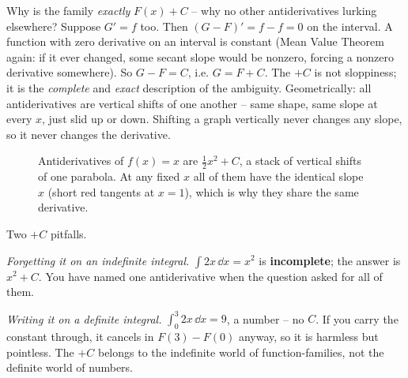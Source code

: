 \begin{whybox}
Why is the family \emph{exactly} $F(x)+C$ -- why no other antiderivatives lurking
elsewhere? Suppose $G'=f$ too. Then $(G-F)'=f-f=0$ on the interval. A function
with zero derivative on an interval is constant (Mean Value Theorem again: if it
ever changed, some secant slope would be nonzero, forcing a nonzero derivative
somewhere). So $G-F=C$, i.e. $G=F+C$. The $+C$ is not sloppiness; it is the
\emph{complete} and \emph{exact} description of the ambiguity. Geometrically: all
antiderivatives are vertical shifts of one another -- same shape, same slope at
every $x$, just slid up or down. Shifting a graph vertically never changes any
slope, so it never changes the derivative.
\end{whybox}

\begin{figure}[H]
\centering
{}
\caption{Antiderivatives of $f(x)=x$ are $\tfrac12 x^2+C$, a stack of vertical
shifts of one parabola. At any fixed $x$ all of them have the identical slope $x$
(short red tangents at $x=1$), which is why they share the same derivative.}
\label{ch21:fig-plusC}
\end{figure}

\begin{trapbox}
Two $+C$ pitfalls.

\emph{Forgetting it on an indefinite integral.} $\int 2x\,\dd x = x^2$ is
\textbf{incomplete}; the answer is $x^2+C$. You have named one antiderivative when
the question asked for all of them.

\emph{Writing it on a definite integral.} $\int_0^3 2x\,\dd x = 9$, a number --
no $C$. If you carry the constant through, it cancels in $F(3)-F(0)$ anyway, so
it is harmless but pointless. The $+C$ belongs to the indefinite world of
function-families, not the definite world of numbers.
\end{trapbox}

